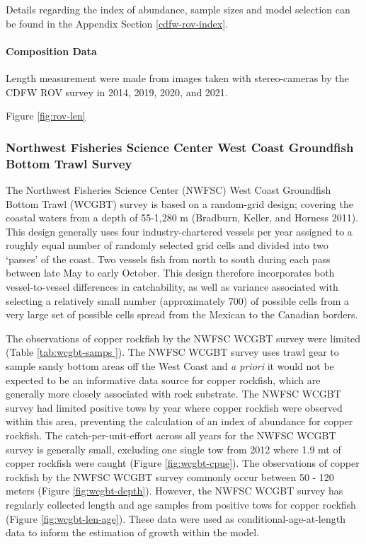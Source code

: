 \documentclass[11pt,
  english,
  letterpaper,
]{article}
\begin{document}
Details regarding the index of abundance, sample sizes and model selection can be found in the Appendix Section \ref{cdfw-rov-index}.

\hypertarget{composition-data-4}{%
\paragraph{Composition Data}\label{composition-data-4}}

\hfill\break

Length measurement were made from images taken with stereo-cameras by the CDFW ROV survey in 2014, 2019, 2020, and 2021.

Figure \ref{fig:rov-len}

\hypertarget{northwest-fisheries-science-center-west-coast-groundfish-bottom-trawl-survey}{%
\subsubsection{Northwest Fisheries Science Center West Coast Groundfish Bottom Trawl Survey}\label{northwest-fisheries-science-center-west-coast-groundfish-bottom-trawl-survey}}

The Northwest Fisheries Science Center (NWFSC) West Coast Groundfish Bottom Trawl (WCGBT) survey is based on a random-grid design; covering the coastal waters from a depth of 55-1,280 m (Bradburn, Keller, and Horness 2011). This design generally uses four industry-chartered vessels per year assigned to a roughly equal number of randomly selected grid cells and divided into two `passes' of the coast. Two vessels fish from north to south during each pass between late May to early October. This design therefore incorporates both vessel-to-vessel differences in catchability, as well as variance associated with selecting a relatively small number (approximately 700) of possible cells from a very large set of possible cells spread from the Mexican to the Canadian borders.

The observations of copper rockfish by the NWFSC WCGBT survey were limited (Table \ref{tab:wcgbt-samps
}). The NWFSC WCGBT survey uses trawl gear to sample sandy bottom areas off the West Coast and \emph{a priori} it would not be expected to be an informative data source for copper rockfish, which are generally more closely associated with rock substrate. The NWFSC WCGBT survey had limited positive tows by year where copper rockfish were observed within this area, preventing the calculation of an index of abundance for copper rockfish. The catch-per-unit-effort across all years for the NWFSC WCGBT survey is generally small, excluding one single tow from 2012 where 1.9 mt of copper rockfish were caught (Figure \ref{fig:wcgbt-cpue}). The observations of copper rockfish by the NWFSC WCGBT survey commonly occur between 50 - 120 meters (Figure \ref{fig:wcgbt-depth}). However, the NWFSC WCGBT survey has regularly collected length and age samples from positive tows for copper rockfish (Figure \ref{fig:wcgbt-len-age}). These data were used as conditional-age-at-length data to inform the estimation of growth within the model.
\end{document}
